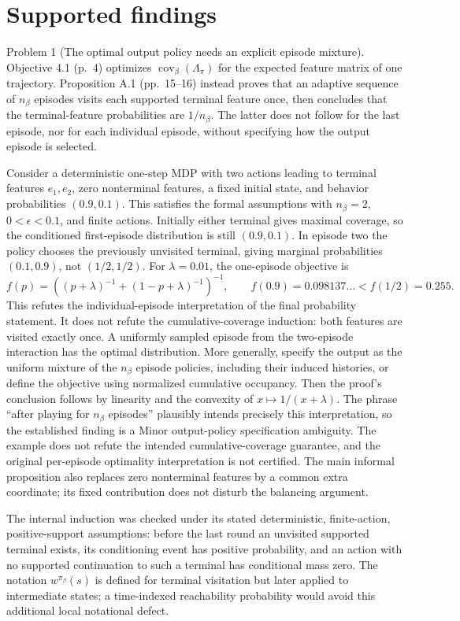 \documentclass[10pt]{article}
\begin{document}
\section*{Supported findings}
Problem 1 (The optimal output policy needs an explicit episode mixture).  Objective 4.1 (p. 4) optimizes \(\operatorname{cov}_{\beta}(\Lambda_\pi)\) for the expected feature matrix of one trajectory. Proposition A.1 (pp. 15–16) instead proves that an adaptive sequence of \(n_\beta\) episodes visits each supported terminal feature once, then concludes that the terminal-feature probabilities are \(1/n_\beta\). The latter does not follow for the last episode, nor for each individual episode, without specifying how the output episode is selected.\par
Consider a deterministic one-step MDP with two actions leading to terminal features \(e_1,e_2\), zero nonterminal features, a fixed initial state, and behavior probabilities \((0.9,0.1)\). This satisfies the formal assumptions with \(n_\beta=2\), \(0<\epsilon<0.1\), and finite actions. Initially either terminal gives maximal coverage, so the conditioned first-episode distribution is still \((0.9,0.1)\). In episode two the policy chooses the previously unvisited terminal, giving marginal probabilities \((0.1,0.9)\), not \((1/2,1/2)\). For \(\lambda=0.01\), the one-episode objective is \[f(p)=\left((p+\lambda)^{-1}+(1-p+\lambda)^{-1}\right)^{-1},
 \qquad f(0.9)=0.098137\ldots< f(1/2)=0.255.\] This refutes the individual-episode interpretation of the final probability statement. It does not refute the cumulative-coverage induction: both features are visited exactly once. A uniformly sampled episode from the two-episode interaction has the optimal distribution. More generally, specify the output as the uniform mixture of the \(n_\beta\) episode policies, including their induced histories, or define the objective using normalized cumulative occupancy. Then the proof’s conclusion follows by linearity and the convexity of \(x\mapsto1/(x+\lambda)\). The phrase “after playing for \(n_\beta\) episodes” plausibly intends precisely this interpretation, so the established finding is a Minor output-policy specification ambiguity. The example does not refute the intended cumulative-coverage guarantee, and the original per-episode optimality interpretation is not certified. The main informal proposition also replaces zero nonterminal features by a common extra coordinate; its fixed contribution does not disturb the balancing argument.\par
The internal induction was checked under its stated deterministic, finite-action, positive-support assumptions: before the last round an unvisited supported terminal exists, its conditioning event has positive probability, and an action with no supported continuation to such a terminal has conditional mass zero. The notation \(w^{\pi_\beta}(s)\) is defined for terminal visitation but later applied to intermediate states; a time-indexed reachability probability would avoid this additional local notational defect.\par
\end{document}
